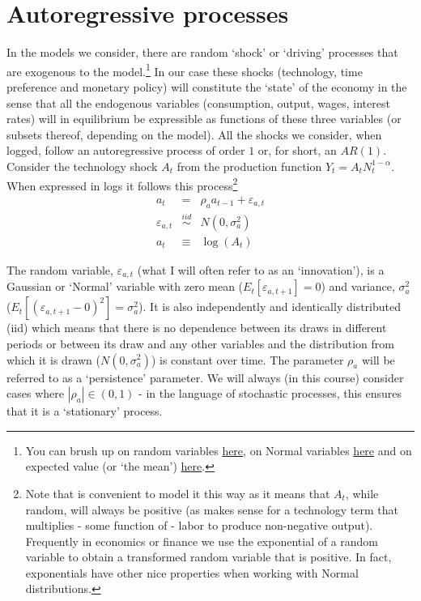 \documentclass[authoryear,11pt]{elsarticle}
\begin{document}
\section{Autoregressive processes}
In the models we consider, there are random `shock' or `driving' processes that are exogenous to the model.\footnote{You can brush up on random variables \href{https://en.wikipedia.org/wiki/Random_variable}{here}, on Normal variables \href{https://en.wikipedia.org/wiki/Normal_distribution}{here} and on expected value (or `the mean') \href{https://en.wikipedia.org/wiki/Expected_value}{here}.} In our case these shocks (technology, time preference and monetary policy) will constitute the `state' of the economy in the sense that all the endogenous variables (consumption, output, wages, interest rates) will in equilibrium be expressible as functions of these three variables (or subsets thereof, depending on the model). All the shocks we consider, when logged, follow an autoregressive process of order $1$ or, for short, an $AR(1)$. Consider the technology shock $A_{t}$ from the production function $Y_{t} = A_{t}N_{t}^{1-\alpha}$. When expressed in logs it follows this process\footnote{Note that is convenient to model it this way as it means that $A_{t}$, while random, will always be positive (as makes sense for a technology term that multiplies - some function of - labor to produce non-negative output). Frequently in economics or finance we use the exponential of a random variable to obtain a transformed random variable that is positive. In fact, exponentials have other nice properties when working with Normal distributions.}
\begin{eqnarray}
a_{t} 			&=& \rho_{a} a_{t-1} + \varepsilon_{a,t} 	\label{eqn:ar1} \\
\varepsilon_{a,t} &\overset{iid}{\sim}& N(0,\sigma^{2}_{a})	\nonumber \\
a_{t}			&\equiv& \log{(A_{t})} \nonumber
\end{eqnarray}

The random variable, $\varepsilon_{a,t}$  (what I will often refer to as an `innovation'), is a Gaussian or `Normal' variable with zero mean ($E_{t}[\varepsilon_{a,t+1}] = 0$) and variance, $\sigma^{2}_{a}$ ($E_{t}[(\varepsilon_{a,t+1} - 0)^{2}] = \sigma^{2}_{a}$). It is also independently and identically distributed (iid) which means that there is no dependence between its draws in different periods or between its draw and any other variables and the distribution from which it is drawn ($N(0,\sigma^{2}_{a})$) is constant over time. The parameter $\rho_{a}$ will be referred to as a `persistence' parameter. We will always (in this course) consider cases where $|\rho_{a}| \in (0,1)$ - in the language of stochastic processes, this ensures that it is a `stationary' process.
\end{document}
